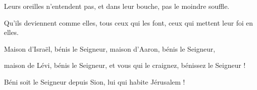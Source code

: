 \item Leurs oreilles n'entendent pas, et dans leur bouche, pas le moindre souffle.

\item Qu'ils deviennent comme elles, tous ceux qui les font, ceux qui mettent leur foi en elles.

\item Maison d'Israël, bénis le Seigneur, maison d'Aaron, bénis le Seigneur,

\item maison de Lévi, bénis le Seigneur, et vous qui le craignez, bénissez le Seigneur !

\item Béni soit le Seigneur depuis Sion, lui qui habite Jérusalem !
